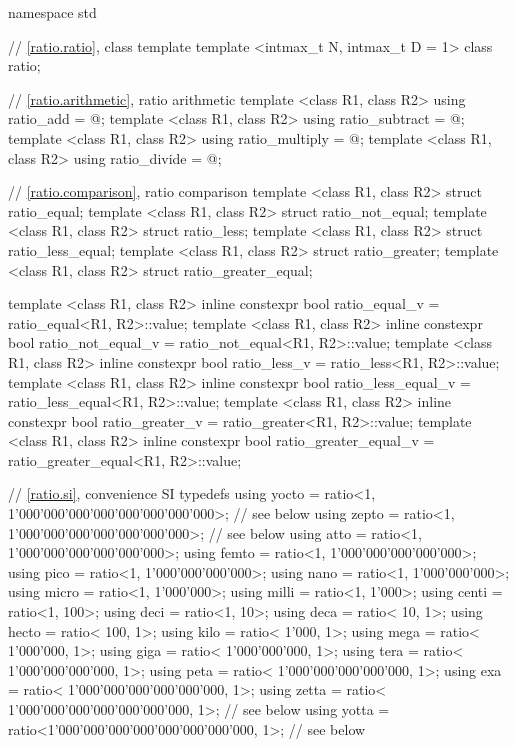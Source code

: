 %
%
\begin{codeblockdigitsep}
namespace std {
  // \ref{ratio.ratio}, class template 
  template <intmax_t N, intmax_t D = 1> class ratio;

  // \ref{ratio.arithmetic}, ratio arithmetic
  template <class R1, class R2> using ratio_add = @\seebelow@;
  template <class R1, class R2> using ratio_subtract = @\seebelow@;
  template <class R1, class R2> using ratio_multiply = @\seebelow@;
  template <class R1, class R2> using ratio_divide = @\seebelow@;

  // \ref{ratio.comparison}, ratio comparison
  template <class R1, class R2> struct ratio_equal;
  template <class R1, class R2> struct ratio_not_equal;
  template <class R1, class R2> struct ratio_less;
  template <class R1, class R2> struct ratio_less_equal;
  template <class R1, class R2> struct ratio_greater;
  template <class R1, class R2> struct ratio_greater_equal;

  template <class R1, class R2>
    inline constexpr bool ratio_equal_v = ratio_equal<R1, R2>::value;
  template <class R1, class R2>
    inline constexpr bool ratio_not_equal_v = ratio_not_equal<R1, R2>::value;
  template <class R1, class R2>
    inline constexpr bool ratio_less_v = ratio_less<R1, R2>::value;
  template <class R1, class R2>
    inline constexpr bool ratio_less_equal_v = ratio_less_equal<R1, R2>::value;
  template <class R1, class R2>
    inline constexpr bool ratio_greater_v = ratio_greater<R1, R2>::value;
  template <class R1, class R2>
    inline constexpr bool ratio_greater_equal_v = ratio_greater_equal<R1, R2>::value;

  // \ref{ratio.si}, convenience SI typedefs
  using yocto = ratio<1, 1'000'000'000'000'000'000'000'000>;  // see below
  using zepto = ratio<1,     1'000'000'000'000'000'000'000>;  // see below
  using atto  = ratio<1,         1'000'000'000'000'000'000>;
  using femto = ratio<1,             1'000'000'000'000'000>;
  using pico  = ratio<1,                 1'000'000'000'000>;
  using nano  = ratio<1,                     1'000'000'000>;
  using micro = ratio<1,                         1'000'000>;
  using milli = ratio<1,                             1'000>;
  using centi = ratio<1,                               100>;
  using deci  = ratio<1,                                10>;
  using deca  = ratio<                               10, 1>;
  using hecto = ratio<                              100, 1>;
  using kilo  = ratio<                            1'000, 1>;
  using mega  = ratio<                        1'000'000, 1>;
  using giga  = ratio<                    1'000'000'000, 1>;
  using tera  = ratio<                1'000'000'000'000, 1>;
  using peta  = ratio<            1'000'000'000'000'000, 1>;
  using exa   = ratio<        1'000'000'000'000'000'000, 1>;
  using zetta = ratio<    1'000'000'000'000'000'000'000, 1>;  // see below
  using yotta = ratio<1'000'000'000'000'000'000'000'000, 1>;  // see below
}
\end{codeblockdigitsep}

